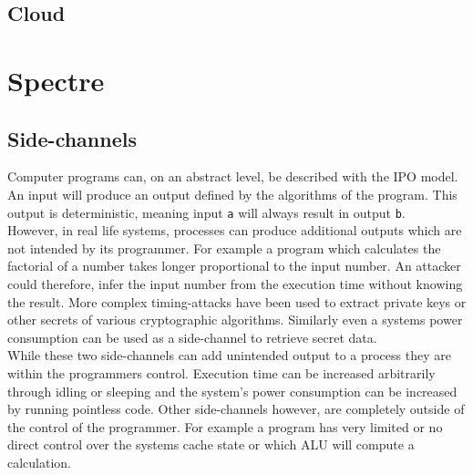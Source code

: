 \documentclass[conference,compsoc,final,a4paper]{IEEEtran}
\begin{document}
\subsection{Cloud}

\section{Spectre}
\subsection{Side-channels}
Computer programs can, on an abstract level, be described with the \ac{IPO} model. An input will produce an output defined by the algorithms
of the program. This output is deterministic, meaning input \lstinline|a| will always result in output \lstinline|b|. \\
However, in real life systems, processes can produce additional outputs which are not intended by its programmer. For example a program which calculates the
factorial of a number takes longer proportional to the input number. An attacker could therefore, infer the input number from the execution time without knowing the
result. More complex timing-attacks have been used to extract private keys or other secrets
of various cryptographic algorithms. \cite{bernstein2005cache}\cite{kocher1996timing}
Similarly even a systems power consumption can be used as a side-channel to retrieve secret data. \cite{kocher1999differential} \\
While these two side-channels can add unintended output to a process they are within the programmers control. Execution time can be increased arbitrarily through
idling or sleeping and the system's power consumption can be increased by running pointless code. Other side-channels however, are completely outside of the
control of the programmer. For example a program has very limited or no direct control over the systems cache state or which \ac{ALU} will compute a calculation.
\end{document}
